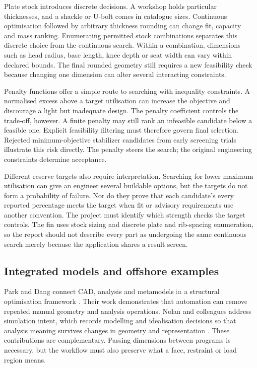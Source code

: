 Plate stock introduces discrete decisions. A workshop holds particular thicknesses, and a shackle or U-bolt comes in catalogue sizes. Continuous optimisation followed by arbitrary thickness rounding can change fit, capacity and mass ranking. Enumerating permitted stock combinations separates this discrete choice from the continuous search. Within a combination, dimensions such as head radius, base length, knee depth or seat width can vary within declared bounds. The final rounded geometry still requires a new feasibility check because changing one dimension can alter several interacting constraints.

Penalty functions offer a simple route to searching with inequality constraints. A normalised excess above a target utilisation can increase the objective and discourage a light but inadequate design. The penalty coefficient controls the trade-off, however. A finite penalty may still rank an infeasible candidate below a feasible one. Explicit feasibility filtering must therefore govern final selection. Rejected minimum-objective stabilizer candidates from early screening trials illustrate this risk directly. The penalty steers the search; the original engineering constraints determine acceptance.

Different reserve targets also require interpretation. Searching for lower maximum utilisation can give an engineer several buildable options, but the targets do not form a probability of failure. Nor do they prove that each candidate's every reported percentage meets the target when fit or advisory requirements use another convention. The project must identify which strength checks the target controls. The fin uses stock sizing and discrete plate and rib-spacing enumeration, so the report should not describe every part as undergoing the same continuous search merely because the application shares a result screen.

\subsection{Integrated models and offshore examples}
\label{sec:lit-integration}

Park and Dang connect CAD, analysis and metamodels in a structural optimisation framework \cite{park2010}. Their work demonstrates that automation can remove repeated manual geometry and analysis operations. Nolan and colleagues address simulation intent, which records modelling and idealisation decisions so that analysis meaning survives changes in geometry and representation \cite{nolan2015}. These contributions are complementary. Passing dimensions between programs is necessary, but the workflow must also preserve what a face, restraint or load region means.

